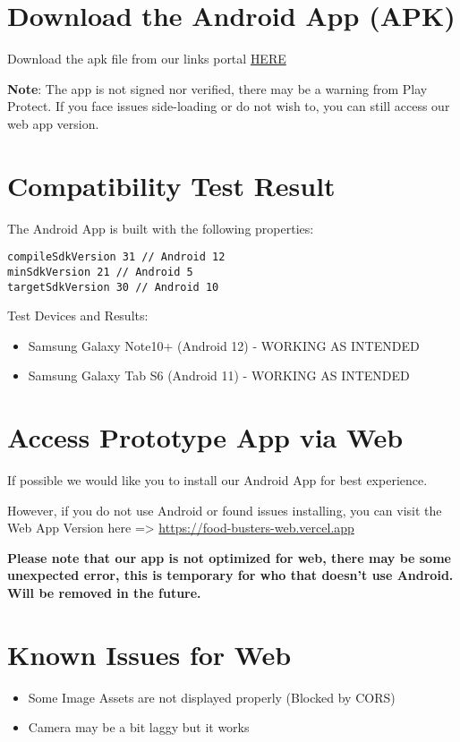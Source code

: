 \documentclass[a4paper,12pt]{article}
\begin{document}
\section*{Download the Android App (APK)}

\noindent
\begin{simplechar}
Download the apk file from our links portal \href{https://food-busters.github.io/prototype}{HERE}
\end{simplechar}

\noindent
\textbf{Note}: The app is not signed nor verified, there may be a warning from Play Protect.
If you face issues side-loading or do not wish to, you can still access our web app version.

\section*{Compatibility Test Result}

\noindent
The Android App is built with the following properties:
\begin{lstlisting}
compileSdkVersion 31 // Android 12
minSdkVersion 21 // Android 5
targetSdkVersion 30 // Android 10
\end{lstlisting}

\noindent
Test Devices and Results:
\begin{itemize}
    \item Samsung Galaxy Note10+ (Android 12) - WORKING AS INTENDED
    \item Samsung Galaxy Tab S6 (Android 11) - WORKING AS INTENDED
\end{itemize}

\section*{Access Prototype App via Web}

If possible we would like you to install our Android App for best experience.

However, if you do not use Android or found issues installing,
you can visit the Web App Version here => \href{https://food-busters-web.vercel.app}{
    https://food-busters-web.vercel.app}

\textbf{
Please note that our app is not optimized for web, there may be some unexpected error, 
this is temporary for who that doesn't use Android. Will be removed in the future.}

\section*{Known Issues for Web}
\begin{itemize}
    \item Some Image Assets are not displayed properly (Blocked by CORS)
    \item Camera may be a bit laggy but it works
\end{itemize}
\end{document}

